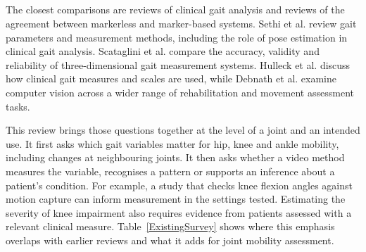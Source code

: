 \subsection{}
\label{sec:review_positioning}
\begin{revision}
The closest comparisons are reviews of clinical gait analysis and reviews of the agreement between markerless and marker-based systems. Sethi et al. \cite{sethi2022comprehensive} review gait parameters and measurement methods, including the role of pose estimation in clinical gait analysis. Scataglini et al. \cite{scataglini2024accuracy} compare the accuracy, validity and reliability of three-dimensional gait measurement systems. Hulleck et al. \cite{hulleck2022present} discuss how clinical gait measures and scales are used, while Debnath et al. \cite{debnath2022review} examine computer vision across a wider range of rehabilitation and movement assessment tasks.

This review brings those questions together at the level of a joint and an intended use. It first asks which gait variables matter for hip, knee and ankle mobility, including changes at neighbouring joints. It then asks whether a video method measures the variable, recognises a pattern or supports an inference about a patient's condition. For example, a study that checks knee flexion angles against motion capture can inform measurement in the settings tested. Estimating the severity of knee impairment also requires evidence from patients assessed with a relevant clinical measure. Table~\ref{ExistingSurvey} shows where this emphasis overlaps with earlier reviews and what it adds for joint mobility assessment.
\end{revision}

